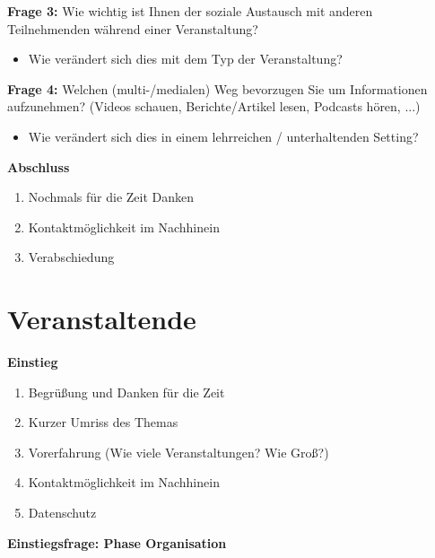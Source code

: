 \textbf{Frage 3:} Wie wichtig ist Ihnen der soziale Austausch mit anderen Teilnehmenden während einer Veranstaltung?
\begin{itemize}[noitemsep,topsep=0pt]
    \item Wie verändert sich dies mit dem Typ der Veranstaltung?
\end{itemize}

\textbf{Frage 4:} Welchen (multi-/medialen) Weg bevorzugen Sie um Informationen aufzunehmen? (Videos schauen, Berichte/Artikel lesen, Podcasts hören, ...)
\begin{itemize}[noitemsep,topsep=0pt]
    \item Wie verändert sich dies in einem lehrreichen / unterhaltenden Setting?
\end{itemize}


\textbf{\large Abschluss}

\begin{enumerate}[noitemsep,topsep=0pt]
    \item Nochmals für die Zeit Danken
    \item Kontaktmöglichkeit im Nachhinein
    \item Verabschiedung
\end{enumerate}


\section{Veranstaltende}

\textbf{\large Einstieg}

\begin{enumerate}[noitemsep,topsep=0pt]
    \item Begrüßung und Danken für die Zeit
    \item Kurzer Umriss des Themas
    \item Vorerfahrung (Wie viele Veranstaltungen? Wie Groß?)
    \item Kontaktmöglichkeit im Nachhinein
    \item Datenschutz
\end{enumerate}

\textbf{\large Einstiegsfrage: Phase Organisation}

